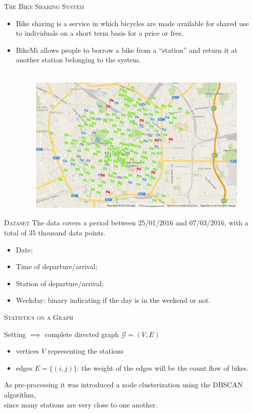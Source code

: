 \documentclass{beamer}
\begin{document}
\begin{frame}{\textsc{The Bike Sharing System}}
\begin{itemize}
	\item Bike sharing is a service in which bicycles are made available for \alert{shared use} to individuals on a short term basis for a price or free.
	\item BikeMi allows people to borrow a bike from a \alert{\textquotedblleft station\textquotedblright} and return it at another station belonging to the system.\\
	\ 
	\begin{figure}[H]
		\centering
		\includegraphics[width=0.7\linewidth]{pictures/mappa.png} 
		\label{fig2}
	\end{figure}
\end{itemize}
	
	
\end{frame}
	
\begin{frame}{\textsc{Dataset}}
	The data covers a period between 25/01/2016 and 07/03/2016, with a total of 35 thousand data points.
	\begin{itemize}[<+->]
		\item<1,2,3,4> Date;
		\item<2,3,4> Time of departure/arrival;
		\item<3,4> Station of departure/arrival;
		\item<4> Weekday: binary indicating if the day is in the weekend or not.
	\end{itemize}
\end{frame}

\begin{frame}{\textsc{Statistics on a Graph}}
	\onslide<1>
	{Setting $\implies$ \alert{complete directed graph} $\mathcal{G} = (V,E)$
	 
	 \begin{itemize}
	 	\item vertices $V$ representing the stations
	 	\item edges $E = \{(i,j)\}$: the weight of the edges will be the count flow of bikes.
	 \end{itemize} 
 	}
 
	{
	As \alert{pre-processing} it was introduced a node clusterization using the \alert{DBSCAN} algorithm,\\ since many stations are very close to one another.
	}
\end{frame}
\end{document}
